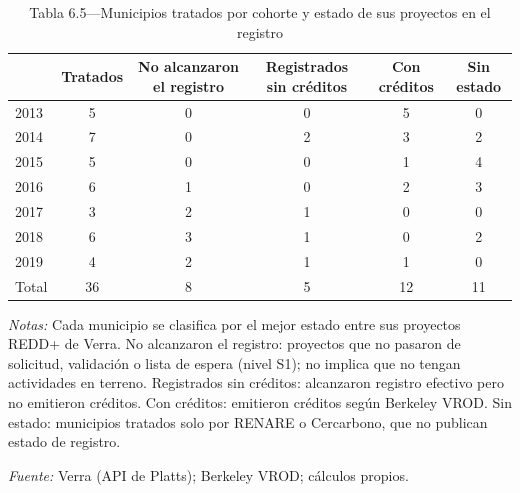 \begin{table}[htbp]
\centering
\small
\caption{Tabla 6.5—Municipios tratados por cohorte y estado de sus proyectos en el registro}
\label{tab:tabla_6_5}
\begin{threeparttable}
\begin{tabular}{@{}lccccc@{}}
\toprule
 & Tratados & No alcanzaron el registro & Registrados sin créditos & Con créditos & Sin estado \\
\midrule
2013 & 5 & 0 & 0 & 5 & 0 \\
2014 & 7 & 0 & 2 & 3 & 2 \\
2015 & 5 & 0 & 0 & 1 & 4 \\
2016 & 6 & 1 & 0 & 2 & 3 \\
2017 & 3 & 2 & 1 & 0 & 0 \\
2018 & 6 & 3 & 1 & 0 & 2 \\
2019 & 4 & 2 & 1 & 1 & 0 \\
\midrule
Total & 36 & 8 & 5 & 12 & 11 \\
\bottomrule
\end{tabular}
\begin{tablenotes}[flushleft]
\footnotesize
\item \textit{Notas:} Cada municipio se clasifica por el mejor estado entre sus proyectos REDD+ de Verra. No alcanzaron el registro: proyectos que no pasaron de solicitud, validación o lista de espera (nivel S1); no implica que no tengan actividades en terreno. Registrados sin créditos: alcanzaron registro efectivo pero no emitieron créditos. Con créditos: emitieron créditos según Berkeley VROD. Sin estado: municipios tratados solo por RENARE o Cercarbono, que no publican estado de registro.
\item \textit{Fuente:} Verra (API de Platts); Berkeley VROD; cálculos propios.
\end{tablenotes}
\end{threeparttable}
\end{table}
